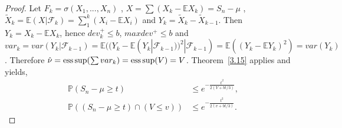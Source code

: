 \begin{proof}
Let $F_k=\sigma(X_1,...,X_n)$ , $X=\sum (X_k-\mathbb{E}X_k) =S_n-\mu$ , $\tilde X_k=\mathbb{E}(X|\mathcal{F}_k)=\sum_{1}^{k}(X_i-\mathbb{E}X_i)$ and $Y_k=\tilde X_k - \tilde X_{k-1}$.
Then~ $Y_k= X_k-\mathbb{E}X_k$, hence  $dev_k^+ \leq b$, $maxdev^+ \leq b $ and $var_k=var(Y_k|\mathcal{F}_{k-1})=\mathbb{E}((Y_k-\mathbb{E}(Y_k|\mathcal{F}_{k-1}))^2|\mathcal{F}_{k-1})=\mathbb{E}((Y_k-\mathbb{E}Y_k)^2)=var(Y_k)$.
Therefore $\hat \nu = \supess(\sum var_k)=\supess(V)=V$. Theorem~\ref{3.15} applies and yields,
\begin{align*}
\mathbb{P}(S_n-\mu \geq t) &\leq e^{-\frac{t^2}{2(V+bt/3)}},\\
\mathbb{P}((S_n-\mu \geq t)\cap(V \leq v)) &\leq e^{-\frac{t^2}{2(v+bt/3)}}.
\end{align*}
 
\end{proof}



